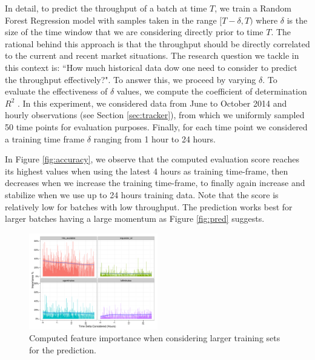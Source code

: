 In detail, to predict the throughput of a batch at time $T$, we train a Random Forest Regression model with samples taken in the range $[T-\delta, T)$ where $\delta$ is the size of the time window that we are   considering directly prior to time $T$. The rational behind this approach is that the throughput should be directly correlated to the current and recent market situations. 
The research question we tackle in this context is: ``How much historical data dow one need to consider to predict the throughput effectively?". To answer this, we proceed by varying $\delta$.
To evaluate the effectiveness of $\delta$ values, we compute the coefficient of determination  $R^2$ \cite{sklearnweb, sklearn}.
In this experiment, we considered  data from June to October 2014 and hourly observations (see Section \ref{sec:tracker}), from which we uniformly sampled 50 time points for evaluation purposes. Finally, for each time point we considered a training time frame $\delta$ ranging from 1 hour to 24 hours. 

In Figure \ref{fig:accuracy}, we observe that the computed evaluation score reaches its highest values when using the latest 4 hours as training time-frame, then decreases when we increase the training time-frame, to finally again increase and stabilize when we use up to 24 hours training data.
Note that the score is relatively low for batches with low throughput. The prediction works best for larger batches having a large momentum as Figure \ref{fig:pred} suggests.



\begin{figure}[htb]
	\centering
		\includegraphics[width=0.5\textwidth]{figures/importances}
	\caption{Computed feature importance when considering larger training sets for the prediction.}
	\label{fig:importances}
\end{figure}


